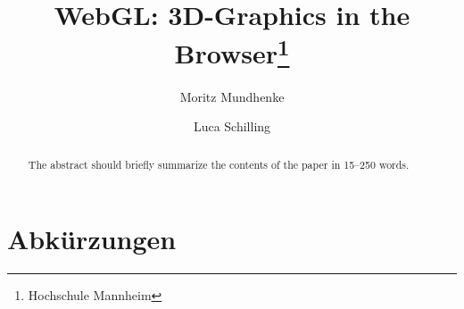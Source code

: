 \documentclass[runningheads]{llncs}
\begin{document}
%
\title{WebGL: 3D-Graphics in the Browser\thanks{Hochschule Mannheim}}
%
%
\author{Moritz Mundhenke \and
Luca Schilling}
%
%
%
\maketitle              %
%


\begin{abstract}
The abstract should briefly summarize the contents of the paper in
15--250 words.

\end{abstract}
%
%
%










\section*{Abkürzungen}
\begin{acronym}[WebASM]
\end{acronym}


{}

\end{document}
